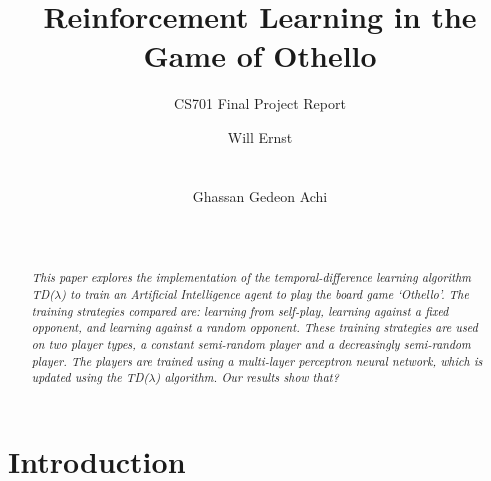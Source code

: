 \documentclass{sig-alternate-05-2015}
\begin{document}
\title{Reinforcement Learning in the Game of Othello} 

\subtitle{CS701 Final Project Report}


\author{
%
\alignauthor
Will Ernst\\
       \\
       \\
\alignauthor
Ghassan Gedeon Achi\\
       \\
       \\
}

\maketitle

\begin{abstract}

	\textit{This paper explores the implementation of the temporal-difference learning algorithm TD(\(\lambda\)) to train an Artificial Intelligence agent to play the board game `Othello'. The training strategies compared are: learning from self-play, learning against a fixed opponent, and learning against a random opponent. These training strategies are used on two player types, a constant semi-random player and a decreasingly semi-random player. The players are trained using a multi-layer perceptron neural network, which is updated using the TD(\(\lambda\)) algorithm. Our results show that?}

\end{abstract}



\section{Introduction}
\end{document}
